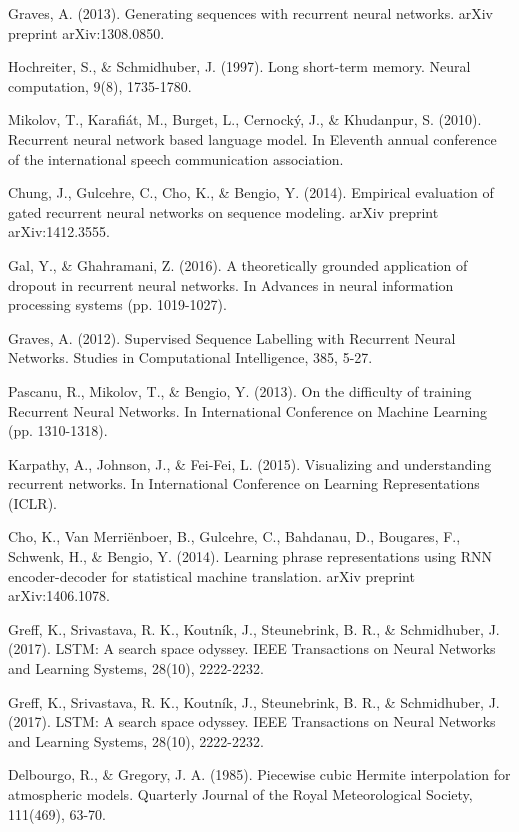 \documentclass{ieeeaccess}
\begin{document}
\begin{thebibliography}{00}
 Graves, A. (2013). Generating sequences with recurrent neural networks. arXiv preprint arXiv:1308.0850.

 Hochreiter, S., \& Schmidhuber, J. (1997). Long short-term memory. Neural computation, 9(8), 1735-1780.

 Mikolov, T., Karafiát, M., Burget, L., Cernocký, J., \& Khudanpur, S. (2010). Recurrent neural network based language model. In Eleventh annual conference of the international speech communication association.

 Chung, J., Gulcehre, C., Cho, K., \& Bengio, Y. (2014). Empirical evaluation of gated recurrent neural networks on sequence modeling. arXiv preprint arXiv:1412.3555.

 Gal, Y., \& Ghahramani, Z. (2016). A theoretically grounded application of dropout in recurrent neural networks. In Advances in neural information processing systems (pp. 1019-1027).

 Graves, A. (2012). Supervised Sequence Labelling with Recurrent Neural Networks. Studies in Computational Intelligence, 385, 5-27.

 Pascanu, R., Mikolov, T., \& Bengio, Y. (2013). On the difficulty of training Recurrent Neural Networks. In International Conference on Machine Learning (pp. 1310-1318).

 Karpathy, A., Johnson, J., \& Fei-Fei, L. (2015). Visualizing and understanding recurrent networks. In International Conference on Learning Representations (ICLR).

 Cho, K., Van Merriënboer, B., Gulcehre, C., Bahdanau, D., Bougares, F., Schwenk, H., \& Bengio, Y. (2014). Learning phrase representations using RNN encoder-decoder for statistical machine translation. arXiv preprint arXiv:1406.1078.

 Greff, K., Srivastava, R. K., Koutník, J., Steunebrink, B. R., \& Schmidhuber, J. (2017). LSTM: A search space odyssey. IEEE Transactions on Neural Networks and Learning Systems, 28(10), 2222-2232.

 Greff, K., Srivastava, R. K., Koutník, J., Steunebrink, B. R., \& Schmidhuber, J. (2017). LSTM: A search space odyssey. IEEE Transactions on Neural Networks and Learning Systems, 28(10), 2222-2232.

 Delbourgo, R., \& Gregory, J. A. (1985). Piecewise cubic Hermite interpolation for atmospheric models. Quarterly Journal of the Royal Meteorological Society, 111(469), 63-70.


\end{thebibliography}
\end{document}
